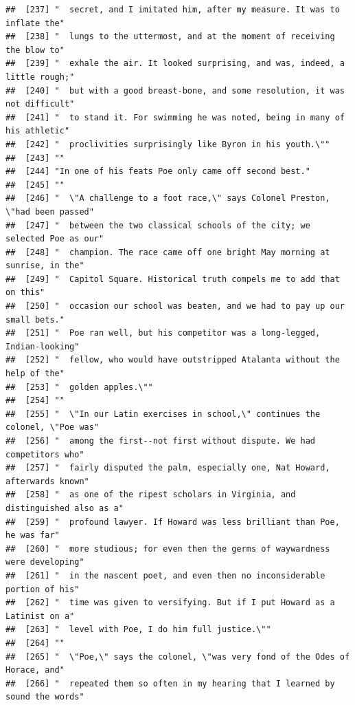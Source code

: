 \documentclass{article}\usepackage[]{graphicx}\usepackage[]{color}
\makeatletter
\newenvironment{kframe}{%
 \def\at@end@of@kframe{}%
 \ifinner\ifhmode%
  \def\at@end@of@kframe{\end{minipage}}%
  \begin{minipage}{\columnwidth}%
 \fi\fi%
 \def\FrameCommand##1{\hskip\@totalleftmargin \hskip-\fboxsep
 \colorbox{shadecolor}{##1}\hskip-\fboxsep
     \hskip-\linewidth \hskip-\@totalleftmargin \hskip\columnwidth}%
 \MakeFramed {\advance\hsize-\width
   \@totalleftmargin\z@ \linewidth\hsize
   \@setminipage}}%
 {\par\unskip\endMakeFramed%
 \at@end@of@kframe}
\newenvironment{knitrout}{}{} %
\makeatother
\begin{document}
\begin{knitrout}
\begin{kframe}
\begin{verbatim}
##  [237] "  secret, and I imitated him, after my measure. It was to inflate the"       
##  [238] "  lungs to the uttermost, and at the moment of receiving the blow to"        
##  [239] "  exhale the air. It looked surprising, and was, indeed, a little rough;"    
##  [240] "  but with a good breast-bone, and some resolution, it was not difficult"    
##  [241] "  to stand it. For swimming he was noted, being in many of his athletic"     
##  [242] "  proclivities surprisingly like Byron in his youth.\""                      
##  [243] ""                                                                            
##  [244] "In one of his feats Poe only came off second best."                          
##  [245] ""                                                                            
##  [246] "  \"A challenge to a foot race,\" says Colonel Preston, \"had been passed"   
##  [247] "  between the two classical schools of the city; we selected Poe as our"     
##  [248] "  champion. The race came off one bright May morning at sunrise, in the"     
##  [249] "  Capitol Square. Historical truth compels me to add that on this"           
##  [250] "  occasion our school was beaten, and we had to pay up our small bets."      
##  [251] "  Poe ran well, but his competitor was a long-legged, Indian-looking"        
##  [252] "  fellow, who would have outstripped Atalanta without the help of the"       
##  [253] "  golden apples.\""                                                          
##  [254] ""                                                                            
##  [255] "  \"In our Latin exercises in school,\" continues the colonel, \"Poe was"    
##  [256] "  among the first--not first without dispute. We had competitors who"        
##  [257] "  fairly disputed the palm, especially one, Nat Howard, afterwards known"    
##  [258] "  as one of the ripest scholars in Virginia, and distinguished also as a"    
##  [259] "  profound lawyer. If Howard was less brilliant than Poe, he was far"        
##  [260] "  more studious; for even then the germs of waywardness were developing"     
##  [261] "  in the nascent poet, and even then no inconsiderable portion of his"       
##  [262] "  time was given to versifying. But if I put Howard as a Latinist on a"      
##  [263] "  level with Poe, I do him full justice.\""                                  
##  [264] ""                                                                            
##  [265] "  \"Poe,\" says the colonel, \"was very fond of the Odes of Horace, and"     
##  [266] "  repeated them so often in my hearing that I learned by sound the words"    

\end{verbatim}
\end{kframe}
\end{knitrout}
\end{document}
